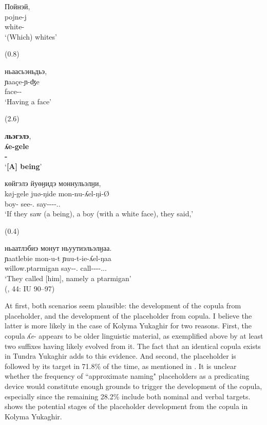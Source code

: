 \documentclass[output=paper,colorlinks,citecolor=brown
\ChapterDOI{10.5281/zenodo.15697581}
]{langscibook}
\begin{document}
\begin{exe}
\ex \label{ex14-cop-as-ph}
    \glll Пойнэй, \\
    pojne-j \\
    white-\Ptcp{} \\
    \glt `(Which) whites'

\sn (0.8)

\sn
    \glll ньаасьэньдьэ, \\
    ɲaaçe-ɲ-ʤe \\
    face-\Prop-\Ptcp{} \\
    \glt `Having a face'

\sn (2.6)

\sn 
    \glll \textbf{льэгэлэ},  \\
    \textbf{ʎe-gele} \\
    \textbf{\Cop-\Acc{}} \\
    \glt `\textbf{[A] being}'

\sn
    \glll көйгэлэ йуөӈидэ моннульэлӈи,  \\
    køj-gele juø-ŋide mon-nu-ʎel-ŋi-Ø \\
    boy-\Acc{} see-\Cvb.\Cond{} say-\Impf-\Ev-\Tpl-\Ass.\Intr.\Ef{} \\
    \glt `If they saw (a being), a boy (with a white face), they said,'

\sn (0.4)

\sn
    \glll ньаатлэбиэ монут ньуутиэльэлӈаа. \\
    ɲaatlebie mon-u-t ɲuu-t-ie-ʎel-ŋaa \\
    willow.ptarmigan say-\Ep-\Cvb.\Ctx{} call-\Unk-\Inch-\Ev-\Ass.\Tr.\Ef.\Tpl \\
    \glt `They called [him], namely a ptarmigan' \\
    \null \hfill (\citealt{Nikolaeva_Mayer2004}, 44: IU 90--97)
\end{exe}


At first, both scenarios seem plausible: the development of the copula from placeholder, and the development of the placeholder from copula.
I believe the latter is more likely in the case of Kolyma Yukaghir for two reasons.
First, the copula \textit{ʎe}- appears to be older linguistic material, as exemplified above by at least two suffixes having likely evolved from it. 
The fact that an identical copula exists in Tundra Yukaghir adds to this evidence. 
And second, the placeholder is followed by its target in 71.8\% of the time, as mentioned in .
It is unclear whether the frequency of ``approximate naming" placeholders as a predicating device would constitute enough grounds to trigger the development of the copula, especially since the remaining 28.2\% include both nominal and verbal targets. 
 shows the potential stages of the placeholder development from the copula in Kolyma Yukaghir.
\end{document}
